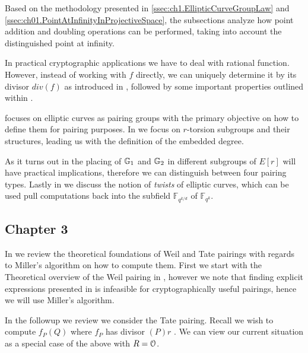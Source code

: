 Based on the methodology presented in \ref{ssec:ch1.EllipticCurveGroupLaw} and \ref{ssec:ch01.PointAtInfinityInProjectiveSpace},
the subsections analyze how point addition and doubling operations can be performed,
taking into account the distinguished point at infinity.

In practical cryptographic applications we have to deal with rational function. 
However, instead of working with $f$ directly, we can uniquely determine it by its divisor $div(f)$ as introduced in , followed by some important properties outlined within .

 focuses on elliptic curves as pairing groups with the primary objective on how to define them for pairing purposes. In  we focus on $r$-torsion subgroups and their structures, leading us with the definition of the embedded degree. 

As it turns out in  the placing of $\mathbb{G}_1$ and $\mathbb{G}_2$ in different subgroups of $E[r]$ will have practical implications, therefore we can distinguish between four pairing types.  Lastly in  we  discuss the notion of \emph{twists} of elliptic curves,  which can be used pull computations back into the subfield
$\mathbb{F}_{q^{k/d}}$ of $\mathbb{F}_{q^k}$. 

\subsection*{Chapter 3}

In  we review the theoretical foundations of Weil and Tate
pairings with regards to Miller’s algorithm on how to compute them.  First we start with the Theoretical overview of the Weil pairing in ,
however we note that finding explicit expressions  presented in  is infeasible for cryptographically useful pairings, hence we will use Miller’s algorithm.

In the followup  we review we consider the Tate pairing. Recall we wish to compute $f_P (Q)$ where $f_P$ has divisor $(P)r$ . We can view our current situation as a special case of the above with $R = \EuScript{O}$.


